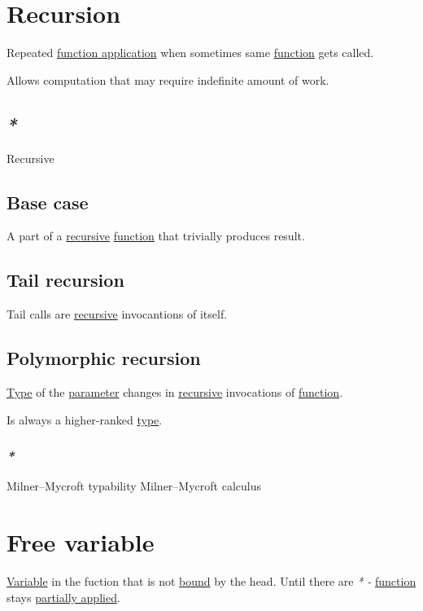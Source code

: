 \documentclass[a4paper,14pt,oneside]{book}
\begin{document}
\section{\label{orga6dea7a}Recursion}
\label{sec:org4137ec7}
Repeated \hyperref[org64bc23b]{function application} when sometimes same \hyperref[orgc39a15c]{function} gets called.

Allows computation that may require indefinite amount of work.

\subsection{\emph{*}}
\label{sec:org9302743}

\label{org8f63f37}Recursive

\subsection{\label{orgb888896}Base case}
\label{sec:org7f4e083}
A part of a \hyperref[org8f63f37]{recursive} \hyperref[orgc39a15c]{function} that trivially produces result.

\subsection{\label{orgca6fbb2}Tail recursion}
\label{sec:orgd8cdca0}
Tail calls are \hyperref[org8f63f37]{recursive} invocantions of itself.

\subsection{\label{org6ae28ff}Polymorphic recursion}
\label{sec:org780cb0e}
\hyperref[orgde40363]{Type} of the \hyperref[org08c9428]{parameter} changes in \hyperref[org8f63f37]{recursive} invocations of \hyperref[orgc39a15c]{function}.

Is always a higher-ranked \hyperref[orgde40363]{type}.

\subsubsection{\emph{*}}
\label{sec:org3b62135}

\label{orgb866697}Milner–Mycroft typability
\label{org842b264}Milner–Mycroft calculus

\section{\label{org9fb1dd7}Free variable}
\label{sec:orgeca1430}
\hyperref[org28687a1]{Variable} in the fuction that is not \hyperref[org70371c4]{bound} by the head.
Until there are \emph{* -} \hyperref[orgc39a15c]{function} stays \hyperref[org82892f8]{partially applied}.
\end{document}
